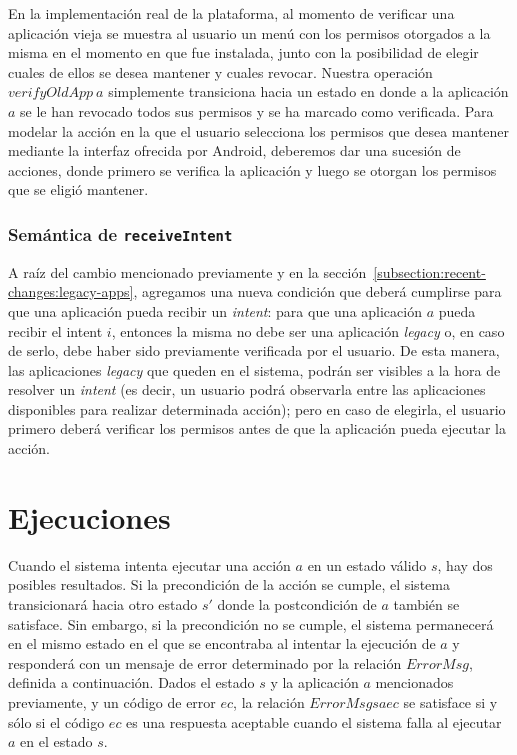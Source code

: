 En la implementación real de la plataforma, al momento de verificar una aplicación vieja se muestra
al usuario un menú con los permisos otorgados a la misma en el momento en que fue instalada, junto
con la posibilidad de elegir cuales de ellos se desea mantener y cuales revocar. Nuestra operación
$verifyOldApp\ a$ simplemente transiciona hacia un estado en donde a la aplicación $a$ se le han
revocado todos sus permisos y se ha marcado como verificada. Para modelar la acción en la que el
usuario selecciona los permisos que desea mantener mediante la interfaz ofrecida por Android,
deberemos dar una sucesión de acciones,  donde primero se verifica la aplicación y luego se otorgan
los permisos que se eligió mantener.

\subsubsection{Semántica de \texttt{receiveIntent}}

A raíz del cambio mencionado previamente y en la
sección~\ref{subsection:recent-changes:legacy-apps}, agregamos una nueva condición que deberá
cumplirse para que una aplicación pueda recibir un \textit{intent}: para que una aplicación $a$
pueda recibir el intent $i$, entonces la misma no debe ser una aplicación \textit{legacy} o, en caso
de serlo, debe haber sido previamente verificada por el usuario. De esta manera, las aplicaciones
\textit{legacy} que queden en el sistema, podrán ser visibles a la hora de resolver un
\textit{intent} (es decir, un usuario podrá observarla entre las aplicaciones disponibles para
realizar determinada acción); pero en caso de elegirla, el usuario primero deberá verificar los
permisos antes de que la aplicación pueda ejecutar la acción.



\section{Ejecuciones}
Cuando el sistema intenta ejecutar una acción $a$ en un estado válido $s$, hay dos posibles
resultados. Si la precondición de la acción se cumple, el sistema transicionará hacia otro estado
$s'$ donde la postcondición de $a$ también se satisface. Sin embargo, si la precondición no se
cumple, el sistema permanecerá en el mismo estado en el que se encontraba al intentar la ejecución
de $a$ y responderá con un mensaje de error determinado por la relación $ErrorMsg$, definida a
continuación. Dados el estado $s$ y la aplicación $a$ mencionados previamente, y un código de error
$ec$, la relación $ErrorMsg s a ec$ se satisface si y sólo si el código $ec$ es una respuesta
aceptable cuando el sistema falla al ejecutar $a$ en el estado $s$.

